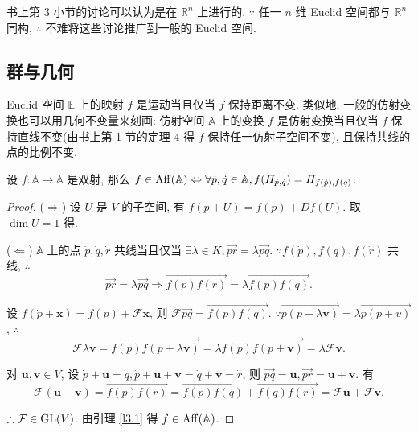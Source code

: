 \documentclass{ctexart}
\begin{document}
书上第 3 小节的讨论可以认为是在 $\mathbb{R}^n$ 上进行的. $\because$ 任一 $n$ 维 Euclid 空间都与 $\mathbb{R}^n$ 同构, $\therefore$ 不难将这些讨论推广到一般的 Euclid 空间.
\subsection{群与几何}
Euclid 空间 $\mathbb{E}$ 上的映射 $f$ 是运动当且仅当 $f$ 保持距离不变. 类似地, 一般的仿射变换也可以用几何不变量来刻画: 仿射空间 $\mathbb{A}$ 上的变换 $f$ 是仿射变换当且仅当 $f$ 保持直线不变(由书上第 1 节的定理 4 得 $f$ 保持任一仿射子空间不变), 且保持共线的点的比例不变.
\begin{theorem}[书上的定理 9]
    设 $f:\mathbb{A}\to\mathbb{A}$ 是双射, 那么 $f\in\operatorname{Aff} (\mathbb{A})\Leftrightarrow\forall\dot{p},\dot{q}\in\mathbb{A},f(\varPi_{\dot{p},\dot{q}})=\varPi_{f(\dot{p}),f(\dot{q})}$.
\end{theorem}
\begin{proof}
    ($\Rightarrow$) 设 $U$ 是 $V$ 的子空间, 有 $f(\dot{p}+U)=f(\dot{p})+Df(U)$. 取 $\dim U=1$ 得.

    ($\Leftarrow$) $\mathbb{A}$ 上的点 $\dot{p},\dot{q},\dot{r}$ 共线当且仅当 $\exists\lambda\in K,\overrightarrow{pr}=\lambda\overrightarrow{pq}$. $\because f(\dot{p}),f(\dot{q}),f(\dot{r})$ 共线, $\therefore$
    \[\overrightarrow{pr}=\lambda\overrightarrow{pq}\Rightarrow\overrightarrow{f(p)f(r)}=\lambda\overrightarrow{f(p)f(q)}.\]

    设 $f(\dot{p}+\boldsymbol{x})=f(\dot{p})+\mathcal{F}\boldsymbol{x}$, 则 $\mathcal{F}\overrightarrow{pq}=\overrightarrow{f(p)f(q)}$. $\because\overrightarrow{p(p+\lambda\boldsymbol{v})}=\lambda\overrightarrow{p(p+v)}$, $\therefore$
    \[\mathcal{F}\lambda\boldsymbol{v}=\overrightarrow{f(\dot{p})f(\dot{p}+\lambda\boldsymbol{v})}=\lambda\overrightarrow{f(\dot{p})f(\dot{p}+\boldsymbol{v})}=\lambda\mathcal{F}\boldsymbol{v}.\]

    对 $\boldsymbol{u},\boldsymbol{v}\in V$, 设 $\dot{p}+\boldsymbol{u}=\dot{q},\dot{p}+\boldsymbol{u}+\boldsymbol{v}=\dot{q}+\boldsymbol{v}=\dot{r}$, 则 $\overrightarrow{pq}=\boldsymbol{u},\overrightarrow{pr}=\boldsymbol{u}+\boldsymbol{v}$. 有
    \[\mathcal{F}(\boldsymbol{u}+\boldsymbol{v})=\overrightarrow{f(\dot{p})f(\dot{r})}=\overrightarrow{f(\dot{p})f(\dot{q})}+\overrightarrow{f(\dot{q})f(\dot{r})}=\mathcal{F}\boldsymbol{u}+\mathcal{F}\boldsymbol{v}.\]

    $\therefore\mathcal{F}\in\operatorname{GL} (V)$. 由引理 \ref{l3.1} 得 $f\in\operatorname{Aff} (\mathbb{A})$.
\end{proof}
\end{document}
